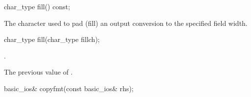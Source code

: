 %
\begin{itemdecl}
char_type fill() const;
\end{itemdecl}

\begin{itemdescr}
\pnum
\returns
The character used to pad (fill) an output conversion to the specified
field width.
\end{itemdescr}

%
\begin{itemdecl}
char_type fill(char_type fillch);
\end{itemdecl}

\begin{itemdescr}
\pnum
\ensures
{}.

\pnum
\returns
The previous value of
.
\end{itemdescr}

%
\begin{itemdecl}
basic_ios& copyfmt(const basic_ios& rhs);
\end{itemdecl}

